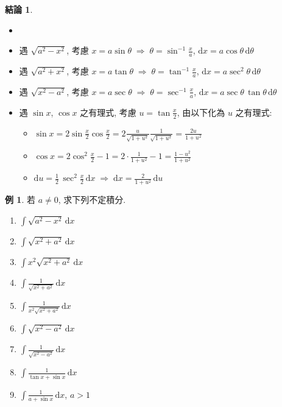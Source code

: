 \documentclass[12pt]{extarticle}
\newcommand{\ds}{\displaystyle}
\newcommand{\ie}{\;\Longrightarrow\;}
\theoremstyle{definition}
\newtheorem*{fact}{結論}
\newtheorem*{ex}{例}
\begin{document}
\begin{fact}
  \begin{itemize}\setlength{\itemsep}{0pt}
    \item[]
    \item 遇 $\ds\sqrt{a^2 - x^2}$, 考慮 $\ds x = a\sin\theta \ie \theta = \sin^{-1}\frac{x}{a}$, $\ds\text{d}x = a\cos\theta\,\text{d}\theta$ 
    \item 遇 $\ds\sqrt{a^2 + x^2}$, 考慮 $\ds x = a\tan\theta \ie \theta = \tan^{-1}\frac{x}{a}$, $\ds\text{d}x = a\sec^2\theta\,\text{d}\theta$
    \item 遇 $\ds\sqrt{x^2 - a^2}$, 考慮 $\ds x = a\sec\theta \ie \theta = \sec^{-1}\frac{x}{a}$, $\ds\text{d}x = a\sec\theta\,\tan\theta\,\text{d}\theta$
    \item 遇 $\ds\sin x$, $\ds\cos x$ 之有理式, 考慮 $\ds u = \tan\frac{x}{2}$, 由以下化為 $u$ 之有理式: 
      \begin{itemize}\setlength{\itemsep}{0pt}
        \item $\ds\sin x = 2\sin\frac{x}{2}\cos\frac{x}{2} = 2\frac{u}{\sqrt{1 + u^2}}\frac{1}{\sqrt{1 + u^2}} = \frac{2 u}{1 + u^2}$
        \item $\ds\cos x = 2\cos^2\frac{x}{2} - 1 = 2\cdot\frac{1}{1 + u^2} - 1 = \frac{1 - u^2}{1 + u^2}$
        \item $\ds\text{d}u = \frac{1}{2}\,\sec^2\frac{x}{2}\,\text{d}x \ie \text{d}x = \frac{2}{1 + u^2}\,\text{d}u$
      \end{itemize}
  \end{itemize}
\end{fact}

\begin{ex} 若 $a\ne 0$, 求下列不定積分. 
  \begin{multicols}{3}
    \begin{enumerate}\setlength{\itemsep}{0pt}
      \item $\ds\int\!\sqrt{a^2 - x^2}\,\text{d}x$
      \item $\ds\int\!\sqrt{x^2 + a^2}\,\text{d}x$
      \item $\ds\int\!x^2\sqrt{x^2 + a^2}\,\text{d}x$
      \item $\ds\int\!\frac{1}{\sqrt{x^2 + a^2}}\,\text{d}x$
      \item $\ds\int\!\frac{1}{x^2\sqrt{x^2 + a^2}}\,\text{d}x$
      \item $\ds\int\!\sqrt{x^2 - a^2}\,\text{d}x$
      \item $\ds\int\!\frac{1}{\sqrt{x^2 - a^2}}\,\text{d}x$
      \item $\ds\int\!\frac{1}{\tan x + \sin x}\,\text{d}x$
      \item $\ds\int\!\frac{1}{a + \sin x}\,\text{d}x$, $a > 1$
    \end{enumerate}
  \end{multicols}
\end{ex}
\end{document}
